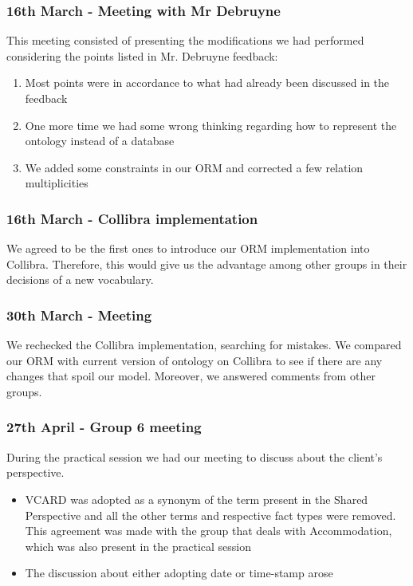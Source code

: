 \documentclass[a4paper,10pt]{article}
\begin{document}
\subsubsection*{16th March - Meeting with Mr Debruyne}
This meeting consisted of presenting the modifications we had performed considering the points listed in Mr. Debruyne feedback:
\begin{enumerate}
  \item Most points were in accordance to what had already been discussed in the feedback
  \item One more time we had some wrong thinking regarding how to represent the ontology instead of a database
  \item We added some constraints in our ORM and corrected a few relation multiplicities
\end{enumerate}

\subsubsection*{16th March - Collibra implementation}
We agreed to be the first ones to introduce our ORM implementation into Collibra. Therefore, this would give us the advantage among other groups in their decisions of a new vocabulary.

\subsubsection*{30th March - Meeting}
We rechecked the Collibra implementation, searching for mistakes. We compared our ORM with current version of ontology on Collibra to see if there are any changes that spoil our model. Moreover, we answered comments from other groups.

\subsubsection*{27th April - Group 6 meeting}
During the practical session we had our meeting to discuss about the client's perspective.
\begin{itemize}
  \item VCARD was adopted as a synonym of the term present in the Shared Perspective and all the other terms and respective fact types were removed. This agreement was made with the group that deals with Accommodation, which was also present in the practical session
  \item The discussion about either adopting date or time-stamp arose
\end{itemize}
\end{document}
